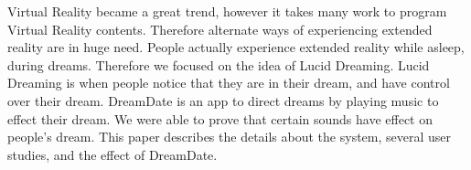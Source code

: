 \begin{jabstract}

\end{jabstract}

\begin{eabstract}
Virtual Reality became a great trend, however it takes many work to program Virtual Reality contents. Therefore alternate ways of experiencing extended reality are in huge need. People actually experience extended reality while asleep, during dreams. Therefore we focused on the idea of Lucid Dreaming. Lucid Dreaming is when people notice that they are in their dream, and have control over their dream. DreamDate is an app to direct dreams by playing music to effect their dream. We were able to prove that certain sounds have effect on people’s dream. This paper describes the details about the system, several user studies, and the effect of DreamDate.
\end{eabstract}